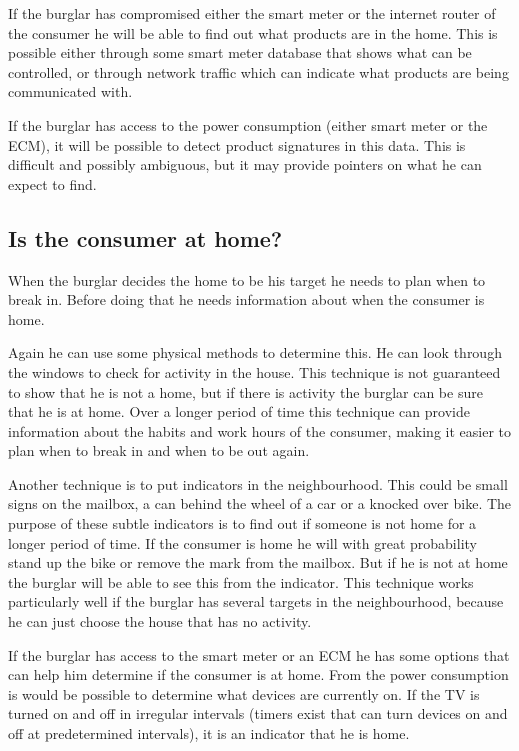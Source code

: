 If the burglar has compromised either the smart meter or the internet router of the consumer he will be able to find out what products are in the home. 
This is possible either through some smart meter database that shows what can be controlled, or through network traffic which can indicate what products are being communicated with.

If the burglar has access to the power consumption (either smart meter or the ECM), it will be possible to detect product signatures in this data.
This is difficult and possibly ambiguous, but it may provide pointers on what he can expect to find.

\subsection{Is the consumer at home?}
When the burglar decides the home to be his target he needs to plan when to break in.
Before doing that he needs information about when the consumer is home.

Again he can use some physical methods to determine this.
He can look through the windows to check for activity in the house.
This technique is not guaranteed to show that he is not a home, but if there is activity the burglar can be sure that he is at home.
Over a longer period of time this technique can provide information about the habits and work hours of the consumer, making it easier to plan when to break in and when to be out again.

Another technique is to put indicators in the neighbourhood.
This could be small signs on the mailbox, a can behind the wheel of a car or a knocked over bike.
The purpose of these subtle indicators is to find out if someone is not home for a longer period of time.
If the consumer is home he will with great probability stand up the bike or remove the mark from the mailbox.
But if he is not at home the burglar will be able to see this from the indicator.
This technique works particularly well if the burglar has several targets in the neighbourhood, because he can just choose the house that has no activity.

If the burglar has access to the smart meter or an ECM he has some options that can help him determine if the consumer is at home.
From the power consumption is would be possible to determine what devices are currently on. 
If the TV is turned on and off in irregular intervals (timers exist that can turn devices on and off at predetermined intervals), it is an indicator that he is home.

